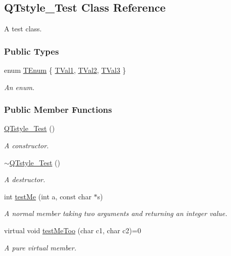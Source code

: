 \hypertarget{class_q_tstyle___test}{}\subsection{Q\+Tstyle\+\_\+\+Test Class Reference}
\label{class_q_tstyle___test}


A test class.  


\subsubsection*{Public Types}
\begin{DoxyCompactItemize}
\item 
enum \hyperlink{class_q_tstyle___test_a0525f798cda415a94fedeceb806d2c49}{T\+Enum} \{ \hyperlink{class_q_tstyle___test_a0525f798cda415a94fedeceb806d2c49a7929af91f99c319ffe2e49c9632bc3fa}{T\+Val1}, 
\hyperlink{class_q_tstyle___test_a0525f798cda415a94fedeceb806d2c49afff89db6859123549579806212d9fd80}{T\+Val2}, 
\hyperlink{class_q_tstyle___test_a0525f798cda415a94fedeceb806d2c49a8227cd0f0c1285d59ff14376fcd00f85}{T\+Val3}
 \}\begin{DoxyCompactList}\small\item\em An enum. \end{DoxyCompactList}
\end{DoxyCompactItemize}
\subsubsection*{Public Member Functions}
\begin{DoxyCompactItemize}
\item 
\hyperlink{class_q_tstyle___test_a14a296ea4e2ad446712f2310bec60766}{Q\+Tstyle\+\_\+\+Test} ()
\begin{DoxyCompactList}\small\item\em A constructor. \end{DoxyCompactList}\item 
\hyperlink{class_q_tstyle___test_a7e82397d534d9a867f0857da01a46e9e}{$\sim$\+Q\+Tstyle\+\_\+\+Test} ()
\begin{DoxyCompactList}\small\item\em A destructor. \end{DoxyCompactList}\item 
int \hyperlink{class_q_tstyle___test_a8840748753118dd468e8368a28e49c62}{test\+Me} (int a, const char $\ast$s)
\begin{DoxyCompactList}\small\item\em A normal member taking two arguments and returning an integer value. \end{DoxyCompactList}\item 
virtual void \hyperlink{class_q_tstyle___test_ad5b201f097a720d44bf976c2f27efbda}{test\+Me\+Too} (char c1, char c2)=0
\begin{DoxyCompactList}\small\item\em A pure virtual member. \end{DoxyCompactList}\end{DoxyCompactItemize}
